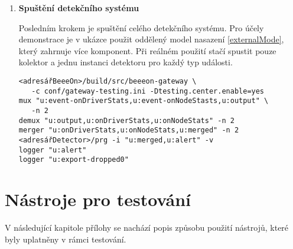 \documentclass[thesis=M,czech]{FITthesis}[2012/06/26]
\begin{document}
\begin{enumerate}
\item \textbf{Spuštění detekčního systému}

Posledním krokem je spuštění celého detekčního systému. Pro účely demonstrace je
v ukázce použit oddělený model nasazení \ref{externalMode}, který zahrnuje více komponent. Při reálném 
použití stačí spustit pouze kolektor a jednu instanci detektoru pro každý typ události.
\begin{verbatim}
<adresářBeeeOn>/build/src/beeeon-gateway \
   -c conf/gateway-testing.ini -Dtesting.center.enable=yes 
mux "u:event-onDriverStats,u:event-onNodeStasts,u:output" \
   -n 2
demux "u:output,u:onDriverStats,u:onNodeStats" -n 2
merger "u:onDriverStats,u:onNodeStats,u:merged" -n 2
<adresářDetector>/prg -i "u:merged,u:alert" -v
logger "u:alert"
logger "u:export-dropped0"
\end{verbatim}
\end{enumerate}


\chapter{Nástroje pro testování}
V následující kapitole přílohy se nachází popis způsobu použití nástrojů, které byly uplatněny 
v rámci testování.
\end{document}
